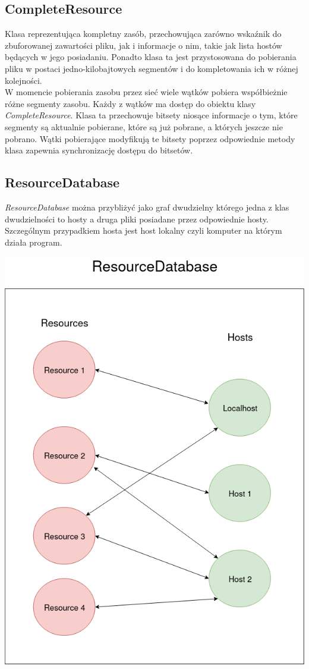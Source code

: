 \documentclass[11pt,oneside]{book}
\newcommand{\+}{\discretionary{\mbox{\scriptsize$\hookleftarrow$}}{}{}}
\begin{document}
\subsection{CompleteResource}
Klasa reprezentująca kompletny zasób, przechowująca zarówno wskaźnik do zbuforowanej zawartości pliku, jak i informacje o nim, takie jak lista hostów będących w jego posiadaniu. Ponadto klasa ta jest przystosowana do pobierania pliku w postaci jedno-kilobajtowych segmentów i do kompletowania ich w różnej kolejności. \\
W momencie pobierania zasobu przez sieć wiele wątków pobiera współbieżnie różne segmenty zasobu. Każdy z wątków ma dostęp do obiektu klasy \textit{CompleteResource}. Klasa ta przechowuje bitsety niosące informacje o tym, które segmenty są aktualnie pobierane, które są już pobrane, a których jeszcze nie pobrano. Wątki pobierające modyfikują te bitsety poprzez odpowiednie metody klasa zapewnia synchronizację dostępu do bitsetów.
\subsection{ResourceDatabase}
\textit{ResourceDatabase} można przybliżyć jako graf dwudzielny którego jedna z klas dwudzielności to hosty a druga pliki posiadane przez odpowiednie hosty.
Szczególnym przypadkiem hosta jest host lokalny czyli komputer na którym działa program.\\
\begin{centering}
	\includegraphics[width=\textwidth]{database}
\end{centering}
\end{document}
